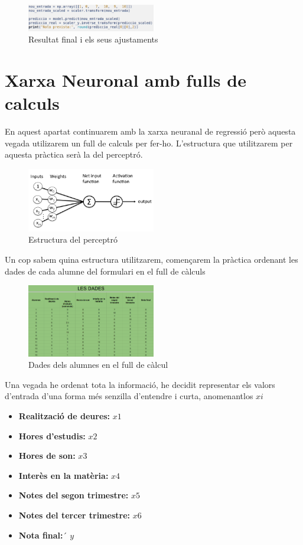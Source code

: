 \begin{figure}[H]
    \centering
    \includegraphics[width=0.5\textwidth]{./figures/29.png}
    \caption{Resultat final i els seus ajustaments}
\end{figure}




\section{Xarxa Neuronal amb fulls de calculs}\label{sec:11}
En aquest apartat continuarem amb la xarxa neuranal de regressió però aquesta vegada utilizarem un full de calculs per fer-ho.
 L'estructura que utilitzarem per aquesta pràctica serà la del perceptró.

\begin{figure}[H]
    \centering
    \includegraphics[width=0.5\textwidth]{./figures/perceptro.png}
    \caption{Estructura del perceptró}
\end{figure}

Un cop sabem quina estructura utilitzarem, començarem la pràctica ordenant les dades de cada alumne del formulari en el full de càlculs

\begin{figure}[H]
    \centering
    \includegraphics[width=0.5\textwidth]{./figures/Dades.png}
    \caption{Dades dels alumnes en el full de càlcul}
\end{figure}

Una vegada he ordenat tota la informació, he decidit representar els valors d'entrada d'una forma més senzilla d'entendre i curta, anomenantlos $xi$
\begin{itemize}
 \item \textbf {Realització de deures:} $x1$
 \item \textbf {Hores d'estudis:} $x2$
 \item \textbf {Hores de son:} $x3$
 \item \textbf {Interès en la matèria:} $x4$
 \item \textbf {Notes del segon trimestre:} $x5$
 \item \textbf {Notes del tercer trimestre:} $x6$
 \item \textbf {Nota final:}´ $y$
\end{itemize}

